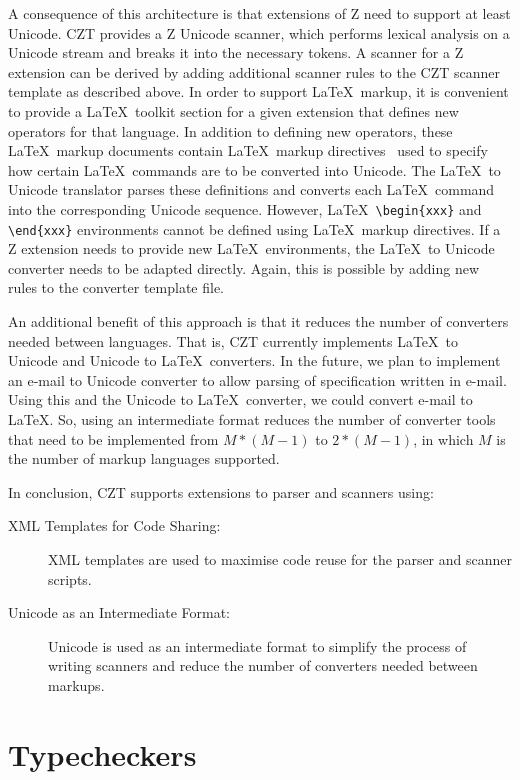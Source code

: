 \documentclass{llncs}
\begin{document}
A consequence of this architecture is that extensions of Z need
to support at least Unicode.  CZT provides a Z Unicode scanner, which
performs lexical analysis on a Unicode stream and breaks it into the
necessary tokens.  A scanner for a Z extension can be derived by
adding additional scanner rules to the CZT scanner template as
described above.  In order to support \LaTeX\ markup, it is convenient
to provide a \LaTeX\ toolkit section for a given extension that
defines new operators for that language.  In
addition to defining new operators, these \LaTeX\ markup documents
contain \LaTeX\ markup directives~\cite{isoz,czt} used to specify how
certain \LaTeX\ commands are to be converted into Unicode.  The
\LaTeX\ to Unicode translator parses these definitions and converts
each \LaTeX\ command into the corresponding Unicode sequence.
However, \LaTeX\ \verb+\begin{xxx}+ and \verb+\end{xxx}+ environments
cannot be defined using \LaTeX\ markup directives.  If a Z extension
needs to provide new \LaTeX\ environments, the \LaTeX\ to Unicode converter
needs to be adapted directly.  Again, this is possible by adding new
rules to the converter template file.

An additional benefit of this approach is that it reduces the number
of converters needed between languages. That is, CZT currently
implements \LaTeX\ to Unicode and Unicode to \LaTeX\ converters. In
the future, we plan to implement an e-mail to Unicode converter to
allow parsing of specification written in e-mail. Using this and the
Unicode to \LaTeX\ converter, we could convert e-mail to \LaTeX. So,
using an intermediate format reduces the number of converter tools
that need to be implemented from $M*(M-1)$ to $2*(M-1)$, in which $M$
is the number of markup languages supported.

In conclusion, CZT supports extensions to parser and scanners using:
\begin{description}
  \item[XML Templates for Code Sharing:] XML templates are used
  to maximise code reuse for the parser and scanner scripts.
  \item[Unicode as an Intermediate Format:] Unicode is used as an
    intermediate format to simplify the process of writing scanners
    and reduce the number of converters needed between markups.
\end{description}


\section{Typecheckers}
\label{typecheckers}
\end{document}
